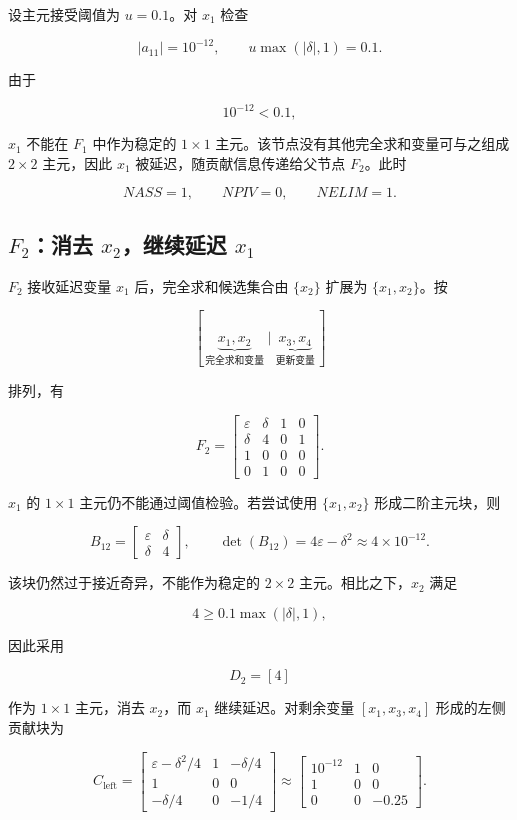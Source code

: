 设主元接受阈值为 $u=0.1$。对 $x_1$ 检查

\[
|a_{11}|=10^{-12},
\qquad
u\max(|\delta|,1)=0.1.
\]

由于

\[
10^{-12}<0.1,
\]

$x_1$ 不能在 $F_1$ 中作为稳定的 $1\times1$ 主元。该节点没有其他完全求和变量可与之组成 $2\times2$ 主元，因此 $x_1$ 被延迟，随贡献信息传递给父节点 $F_2$。此时

\[
NASS=1,
\qquad
NPIV=0,
\qquad
NELIM=1.
\]

\subsection{$F_2$：消去 $x_2$，继续延迟 $x_1$}

$F_2$ 接收延迟变量 $x_1$ 后，完全求和候选集合由 $\{x_2\}$ 扩展为 $\{x_1,x_2\}$。按

\[
[\,\underbrace{x_1,x_2}_{\text{完全求和变量}}
\mid
\underbrace{x_3,x_4}_{\text{更新变量}}\,]
\]

排列，有

\[
F_2=
\begin{bmatrix}
\varepsilon&\delta&1&0\\
\delta&4&0&1\\
1&0&0&0\\
0&1&0&0
\end{bmatrix}.
\]

$x_1$ 的 $1\times1$ 主元仍不能通过阈值检验。若尝试使用 $\{x_1,x_2\}$ 形成二阶主元块，则

\[
B_{12}=
\begin{bmatrix}
\varepsilon&\delta\\
\delta&4
\end{bmatrix},
\qquad
\det(B_{12})=4\varepsilon-\delta^2
\approx4\times10^{-12}.
\]

该块仍然过于接近奇异，不能作为稳定的 $2\times2$ 主元。相比之下，$x_2$ 满足

\[
4\ge0.1\max(|\delta|,1),
\]

因此采用

\[
D_2=[4]
\]

作为 $1\times1$ 主元，消去 $x_2$，而 $x_1$ 继续延迟。对剩余变量 $[x_1,x_3,x_4]$ 形成的左侧贡献块为

\[
C_{\mathrm{left}}=
\begin{bmatrix}
\varepsilon-\delta^2/4&1&-\delta/4\\
1&0&0\\
-\delta/4&0&-1/4
\end{bmatrix}
\approx
\begin{bmatrix}
10^{-12}&1&0\\
1&0&0\\
0&0&-0.25
\end{bmatrix}.
\]

